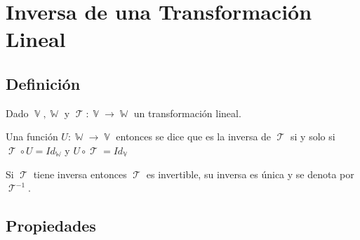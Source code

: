 \documentclass[12pt, fleqn]{report}                             %
\theoremstyle{break}                                            %
\DeclareMathOperator \VectorSet    {\mathbb{V}}                 %
\DeclareMathOperator \SubVectorSet {\mathbb{W}}                 %
\DeclareMathOperator \LinTrans {\mathcal{T}}                    %
\begin{document}
        \clearpage
        \section{Inversa de una Transformación Lineal}

            \subsection{Definición}

                Dado $\VectorSet, \SubVectorSet$ y $\LinTrans: \VectorSet \to \SubVectorSet$ un
                transformación lineal.

                Una función $U: \SubVectorSet \to \VectorSet$ entonces
                se dice que es la inversa de $\LinTrans$ si y solo si
                $\LinTrans \circ U = Id_{\SubVectorSet}$ y $U \circ \LinTrans = Id_{\VectorSet}$

                Si $\LinTrans$ tiene inversa entonces $\LinTrans$ es invertible, su inversa
                es única y se denota por $\LinTrans^{-1}$.


            
            \vspace{1em}
            \subsection{Propiedades} 
\end{document}

